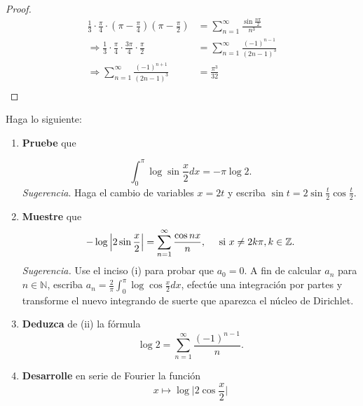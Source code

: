 \documentclass[12pt]{report}
\newcounter{it}
\theoremstyle{largebreak}
\begin{document}
\begin{proof}
\begin{equation*}
            \begin{split}
                \frac{1}{3}\cdot\frac{\pi}{4}\cdot(\pi-\frac{\pi}{4})(\pi-\frac{\pi}{2})&=\sum_{ n=1}^{\infty}\frac{\sin\frac{n\pi}{2}}{n^3}\\
                \Rightarrow \frac{1}{3}\cdot\frac{\pi}{4}\cdot\frac{3\pi}{4}\cdot\frac{\pi}{2}&=\sum_{ n=1}^{\infty }\frac{(-1)^{ n-1}}{(2n-1)^3}\\
                \Rightarrow \sum_{ n=1}^{\infty }\frac{(-1)^{ n+1}}{(2n-1)^3}&=\frac{\pi^3}{32}\\
            \end{split}
        \end{equation*}
    \end{proof}

    \renewcommand{\theenumi}{\textbf{\roman{enumi}}}
    
    \begin{excer}
        Haga lo siguiente:
        \begin{enumerate}
            \item \textbf{Pruebe} que
            
            \begin{equation*}
                \int_0^\pi\log\sin\frac{x}{2}dx=-\pi\log2.
            \end{equation*}
            \textit{Sugerencia}. Haga el cambio de variables $x=2t$ y escriba $\sin t =2\sin\frac{t}{2}\cos\frac{t}{2}$.
            \item \textbf{Muestre} que
            \begin{equation*}
                -\log\Big|2\sin\frac{x}{2}\Big|=\sum_{ n=1}^\infty\frac{\cos nx}{n},\quad\textup{ si }x\neq 2k\pi,k\in\mathbb{Z}.
            \end{equation*}
            \textit{Sugerencia.} Use el inciso (i) para probar que $a_0=0$. A fin de calcular $a_n$ para $n\in\mathbb{N}$, escriba $a_n=\frac{2}{\pi}\int_0^\pi\log\cos\frac{x}{2}dx$, efectúe una integración por partes y transforme el nuevo integrando de suerte que aparezca el núcleo de Dirichlet.
            \item \textbf{Deduzca} de (ii) la fórmula
            \begin{equation*}
                \log2=\sum_{ n=1}^\infty\frac{(-1)^{ n-1}}{n}.
            \end{equation*}
            \item \textbf{Desarrolle} en serie de Fourier la función
            \begin{equation*}
                x\mapsto\log\Big|2\cos\frac{x}{2}\Big|
            \end{equation*}
        \end{enumerate}
    \end{excer}
\end{document}
